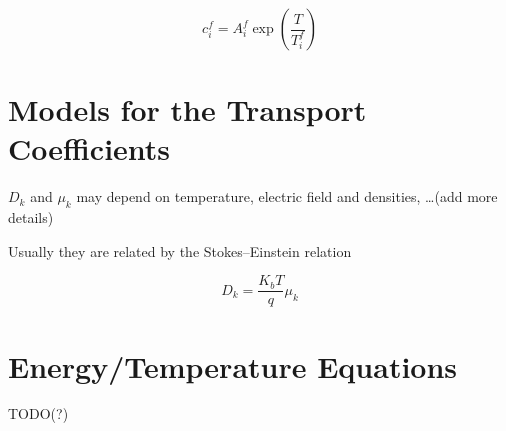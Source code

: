 \documentclass[11pt]{amsart}
\begin{document}
$$
c^{f}_i = A^{f}_{i} \exp\left( \dfrac{T}{T^{f}_{i}} \right)
$$

\section{Models for the Transport Coefficients}

$D_{k}$ and $\mu_{k}$ may depend on temperature, electric field and densities, \dots(add more details)

Usually they are related by the Stokes--Einstein relation 

$$
D_{k} = \dfrac{K_{b} T}{q} \mu_{k}
$$

\section{Energy/Temperature Equations}
TODO(?)
\end{document}
